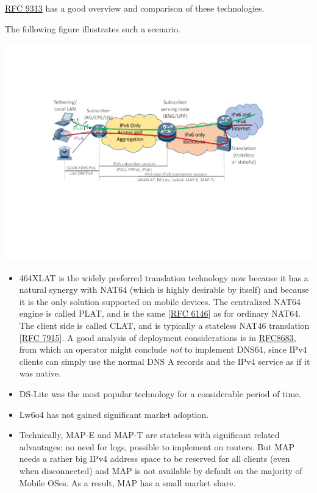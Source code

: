 \documentclass[
]{article}
\begin{document}
\href{https://www.rfc-editor.org/info/rfc9313}{RFC 9313} has a good
overview and comparison of these technologies.

The following figure illustrates such a scenario.

\includegraphics{vasilenko-IPv4aaS.png}

\begin{itemize}
\item
  464XLAT is the widely preferred translation technology now because it
  has a natural synergy with NAT64 (which is highly desirable by itself)
  and because it is the only solution supported on mobile devices. The
  centralized NAT64 engine is called PLAT, and is the same
  {[}\href{https://www.rfc-editor.org/info/rfc6146}{RFC 6146}{]} as for
  ordinary NAT64. The client side is called CLAT, and is typically a
  stateless NAT46 translation
  {[}\href{https://www.rfc-editor.org/info/rfc7915}{RFC 7915}{]}. A good
  analysis of deployment considerations is in
  \href{https://www.rfc-editor.org/info/rfc8683}{RFC8683}, from which an
  operator might conclude \emph{not} to implement DNS64, since IPv4
  clients can simply use the normal DNS A records and the IPv4 service
  as if it was native.
\item
  DS-Lite was the most popular technology for a considerable period of
  time.
\item
  Lw6o4 has not gained significant market adoption.
\item
  Technically, MAP-E and MAP-T are stateless with significant related
  advantages: no need for logs, possible to implement on routers. But
  MAP needs a rather big IPv4 address space to be reserved for all
  clients (even when disconnected) and MAP is not available by default
  on the majority of Mobile OSes. As a result, MAP has a small market
  share.
\end{itemize}
\end{document}
